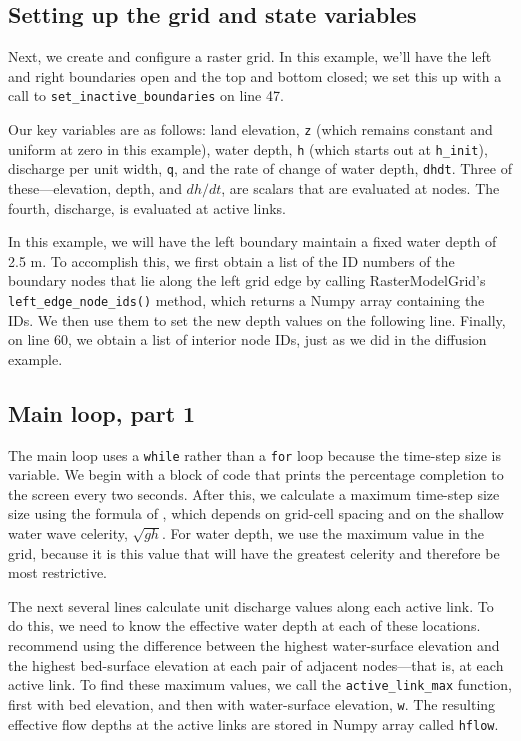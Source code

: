 \documentclass[12pt]{article}
\newcommand{\code}[1]{{\tt #1}}
\begin{document}
\subsection{Setting up the grid and state variables}



Next, we create and configure a raster grid. In this example, we'll have the left and right boundaries open and the top and bottom closed; we set this up with a call to \code{set\_inactive\_boundaries} on line 47.

Our key variables are as follows: land elevation, \code{z} (which remains constant and uniform at zero in this example), water depth, \code{h} (which starts out at \code{h\_init}), discharge per unit width, \code{q}, and the rate of change of water depth, \code{dhdt}. Three of these---elevation, depth, and $dh/dt$, are scalars that are evaluated at nodes. The fourth, discharge, is evaluated at active links.

In this example, we will have the left boundary maintain a fixed water depth of 2.5 m. To accomplish this, we first obtain a list of the ID numbers of the boundary nodes that lie along the left grid edge by calling RasterModelGrid's \code{left\_edge\_node\_ids()} method, which returns a Numpy array containing the IDs. We then use them to set the new depth values on the following line. Finally, on line 60, we obtain a list of interior node IDs, just as we did in the diffusion example.

\subsection{Main loop, part 1}



The main loop uses a \code{while} rather than a \code{for} loop because the time-step size is variable. We begin with a block of code that prints the percentage completion to the screen every two seconds. After this, we calculate a maximum time-step size size using the formula of \citet{bates2010simple}, which depends on grid-cell spacing and on the shallow water wave celerity, $\sqrt{g h}$. For water depth, we use the maximum value in the grid, because it is this value that will have the greatest celerity and therefore be most restrictive.

The next several lines calculate unit discharge values along each active link. To do this, we need to know the effective water depth at each of these locations. \citet{bates2010simple} recommend using the difference between the highest water-surface elevation and the highest bed-surface elevation at each pair of adjacent nodes---that is, at each active link. To find these maximum values, we call the \code{active\_link\_max} function, first with bed elevation, and then with water-surface elevation, \code{w}. The resulting effective flow depths at the active links are stored in Numpy array called \code{hflow}. 
\end{document}
